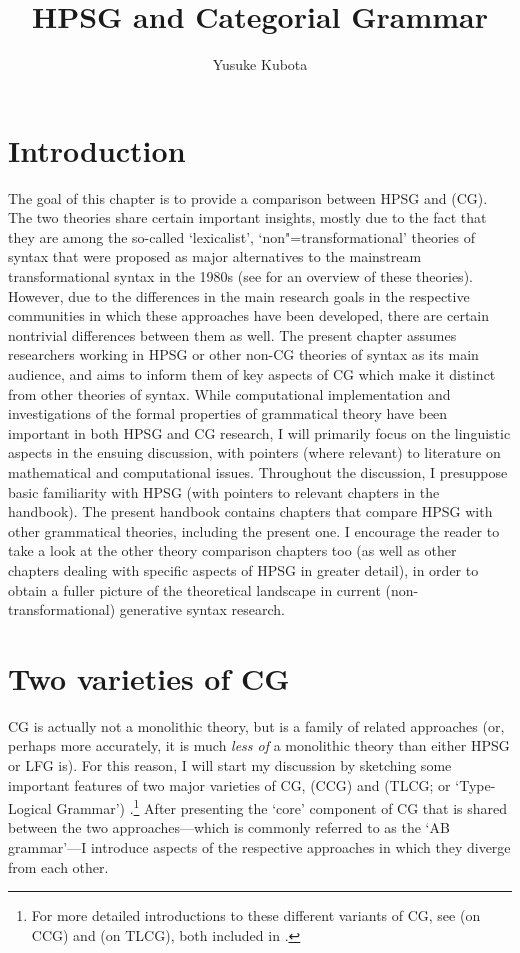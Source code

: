 \documentclass[output=paper]{langsci/langscibook}
\author{Yusuke Kubota\affiliation{National Institute for Japanese Language and Linguistics}}
\title{HPSG and Categorial Grammar}
\begin{document}
\label{chap-cg}


\section{Introduction}

The goal of this chapter is to provide a comparison between HPSG and
 (CG). The two theories share certain important
insights, mostly due to the fact that they are among the so-called
`lexicalist', `non"=transformational' theories of syntax that were
proposed as major alternatives to the mainstream transformational
syntax in the 1980s (see \citet{BB2011a} for an overview of these
theories). However, due to the differences in the main research goals
in the respective communities in which these approaches have been
developed, there are certain nontrivial differences between them as
well. The present chapter assumes researchers working in HPSG or other
non-CG theories of syntax as its main audience, and aims to inform
them of key aspects of CG which make it distinct from other theories
of syntax. While computational implementation and investigations of the
formal properties of grammatical theory have been important in both
HPSG and CG research, I will primarily focus on the linguistic aspects
in the ensuing discussion, with pointers (where relevant) to literature on mathematical
and computational issues. Throughout the discussion, I presuppose
basic familiarity with HPSG (with pointers to relevant chapters in the
handbook). The present handbook contains chapters that compare HPSG
with other grammatical theories, including the present one. I
encourage the reader to take a look at the other theory comparison
chapters too (as well as other chapters dealing with specific
aspects of HPSG in greater detail), in order to obtain a fuller picture of the
theoretical landscape in current (non-transformational) generative
syntax research.


\section{Two varieties of CG \label{cgexposition}}

CG is actually not a monolithic theory, but is a family of related
approaches (or, perhaps more accurately, it is much \emph{less of} a
monolithic theory than either HPSG or LFG is). For this reason, I will
start my discussion by sketching some important features of two major
varieties of CG,  (CCG)
\citep{Steedman2000a-u,steedman2012} and 
(TLCG; or `Type-Logical Grammar')
\citep{Morrill94a-u,Moortgat2011a-u,KubotaLevineBook}.\footnote{For 
more detailed introductions to these different variants of CG, see 
\citet{steedman2011ccg} (on CCG) and \citet{oehrle2011} (on 
TLCG), both included in \citet{BB2011a}.} After presenting the `core'
component of CG that is shared between the two approaches---which is
commonly referred to as the `AB grammar'---I introduce
aspects of the respective approaches in which they diverge from each
other.
\end{document}
